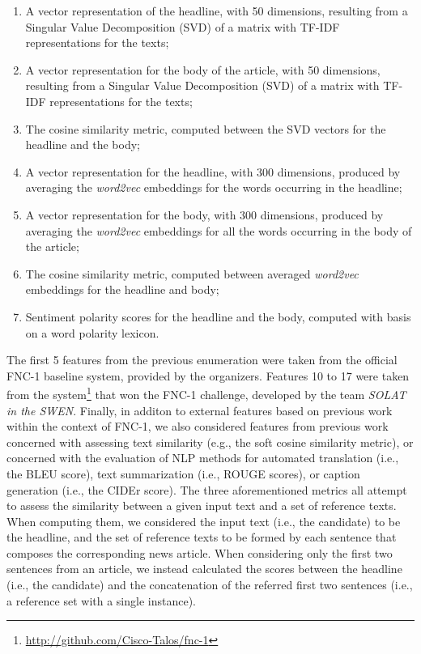 \begin{enumerate}
\item A vector representation of the headline, with 50 dimensions, resulting from a Singular Value Decomposition (SVD) of a matrix with TF-IDF representations for the texts;

\item A vector representation for the body of the article, with 50 dimensions, resulting from a Singular Value Decomposition (SVD) of a matrix with TF-IDF representations for the texts;

\item The cosine similarity metric, computed between the SVD vectors for the headline and the body;

\item A vector representation for the headline, with 300 dimensions, produced by averaging the \textit{word2vec} embeddings for the words occurring in the headline;

\item A vector representation for the body, with 300 dimensions, produced by averaging the \textit{word2vec} embeddings for all the words occurring in the body of the article;

\item The cosine similarity metric, computed between averaged \textit{word2vec} embeddings for the headline and body;

\item Sentiment polarity scores for the headline and the body, computed with basis on a word polarity lexicon.
\end{enumerate}

The first 5 features from the previous enumeration were taken from the official FNC-1 baseline system, provided by the organizers. Features 10 to 17 were taken from the system\footnote{\scriptsize{\url{http://github.com/Cisco-Talos/fnc-1}}} that won the FNC-1 challenge, developed by the team \textit{SOLAT in the SWEN}. Finally, in additon to external features based on previous work within the context of FNC-1, we also considered features from previous work concerned with assessing text similarity (e.g., the soft cosine similarity metric), or concerned with the evaluation of NLP methods for automated translation (i.e., the BLEU score), text summarization (i.e., ROUGE scores), or caption generation (i.e., the CIDEr score). The three aforementioned metrics all attempt to assess the similarity between a given input text and a set of reference texts. When computing them, we considered the input text (i.e., the candidate) to be the headline, and the set of reference texts to be formed by each sentence that composes the corresponding news article. When considering only the first two sentences from an article, we instead calculated the scores between the headline (i.e., the candidate) and the concatenation of the referred first two sentences (i.e., a reference set with a single instance).


